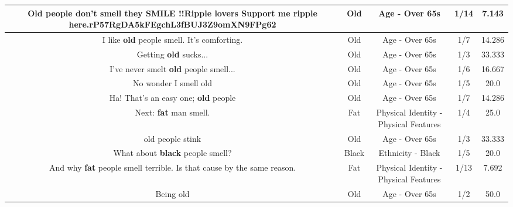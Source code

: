 \documentclass[11pt]{article}
\newlength\mylength
\begin{document}
\begin{center}
\begin{longtable}{|C{.65\mylength}|C{.30\mylength}|C{.12\mylength}|C{.12\mylength}|C{.12\mylength}|}
  \small Old people don't smell they SMILE !!Ripple lovers Support me ripple here.rP57RgDA5kFEgchL3fBUJ3Z9omXN9FPg62\normalsize   & Old & Age - Over 65s & 1/14 & 7.143 \\  \hline
  \small I like \textbf{old} people smell. It's comforting.\normalsize   & Old & Age - Over 65s & 1/7 & 14.286 \\  \hline
  \small Getting \textbf{old} sucks...\normalsize   & Old & Age - Over 65s & 1/3 & 33.333 \\  \hline
  \small I've never smelt \textbf{old} people smell...\normalsize   & Old & Age - Over 65s & 1/6 & 16.667 \\  \hline
  \small No wonder I smell old\normalsize   & Old & Age - Over 65s & 1/5 & 20.0 \\  \hline
  \small Ha! That's an easy one; \textbf{old} people\normalsize   & Old & Age - Over 65s & 1/7 & 14.286 \\  \hline
  \small Next: \textbf{fat} man smell.\normalsize   & Fat & Physical Identity - Physical Features & 1/4 & 25.0 \\  \hline
  \small old people stink\normalsize   & Old & Age - Over 65s & 1/3 & 33.333 \\  \hline
  \small What about \textbf{black} people smell?\normalsize   & Black & Ethnicity - Black & 1/5 & 20.0 \\  \hline
  \small And why \textbf{fat} people smell terrible. Is that cause by the same reason.\normalsize   & Fat & Physical Identity - Physical Features & 1/13 & 7.692 \\  \hline
  \small Being old\normalsize   & Old & Age - Over 65s & 1/2 & 50.0 \\  \hline

\end{longtable}
\end{center}
\end{document}
